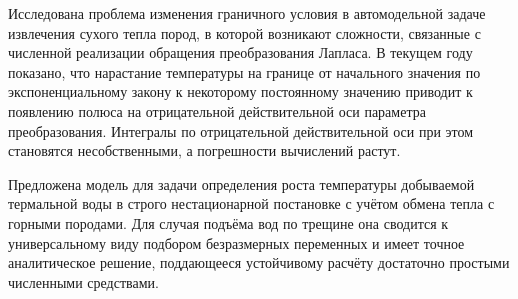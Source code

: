 Исследована проблема изменения граничного условия в автомодельной задаче извлечения сухого тепла пород, в которой возникают сложности, связанные с численной реализации обращения преобразования Лапласа.
В текущем году показано, что нарастание температуры на границе от начального значения по экспоненциальному закону к некоторому постоянному значению приводит
к появлению полюса на отрицательной действительной оси параметра преобразования.
Интегралы по отрицательной действительной оси при этом становятся несобственными, а погрешности вычислений растут.



Предложена модель для задачи определения роста температуры добываемой термальной воды в строго нестационарной постановке с учётом обмена тепла с горными породами. Для случая подъёма вод по трещине она сводится к универсальному виду подбором безразмерных переменных и имеет точное аналитическое решение, поддающееся устойчивому расчёту достаточно простыми численными средствами. 